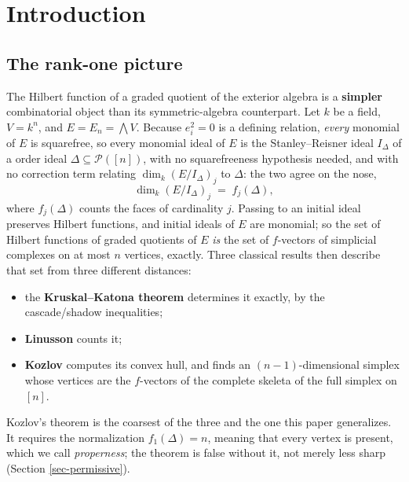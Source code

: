 \documentclass[11pt, a4paper, abstract=yes]{scrartcl}
\theoremstyle{definition}
\theoremstyle{remark}
\theoremstyle{plain}
\let\autocite\cite
\begin{document}
\section{Introduction}
\label{sec:orgd2e0c8b}

\subsection{The rank-one picture}
\label{sec:org68bd1d2}

The Hilbert function of a graded quotient of the exterior algebra is a \textbf{simpler} combinatorial
object than its symmetric-algebra counterpart. Let \(k\) be a field, \(V=k^n\), and
\(E=E_n=\bigwedge V\). Because \(e_i^2=0\) is a defining relation, \emph{every} monomial of \(E\) is
squarefree, so every monomial ideal of \(E\) is the Stanley--Reisner ideal \(I_\Delta\) of a
order ideal \(\Delta\subseteq\mathcal P([n])\), with no squarefreeness hypothesis needed, and
with no correction term relating \(\dim_k(E/I_\Delta)_j\) to \(\Delta\): the two agree on the nose,
\begin{equation}\label{eq:eq-2}
  \dim_k(E/I_\Delta)_j \;=\; f_j(\Delta),
\end{equation}
where \(f_j(\Delta)\) counts the faces of cardinality \(j\). Passing to an initial ideal preserves
Hilbert functions, and initial ideals of \(E\) are monomial; so the set of Hilbert functions of
graded quotients of \(E\) \emph{is} the set of \(f\)-vectors of simplicial complexes on at most \(n\)
vertices, exactly. Three classical results then describe that set from three different distances:

\begin{itemize}
\item the \textbf{Kruskal--Katona theorem} determines it exactly, by the cascade/shadow inequalities;
\item \textbf{Linusson} \autocite{Linusson1999} counts it;
\item \textbf{Kozlov} \autocite{Kozlov1997} computes its convex hull, and finds an \((n-1)\)-dimensional simplex whose vertices
are the \(f\)-vectors of the complete skeleta of the full simplex on \([n]\).
\end{itemize}

Kozlov's theorem is the coarsest of the three and the one this paper generalizes. It requires the
normalization \(f_1(\Delta)=n\), meaning that every vertex is present, which we call
\emph{properness}; the
theorem is false without it, not merely less sharp (Section \ref{sec-permissive}).
\end{document}
